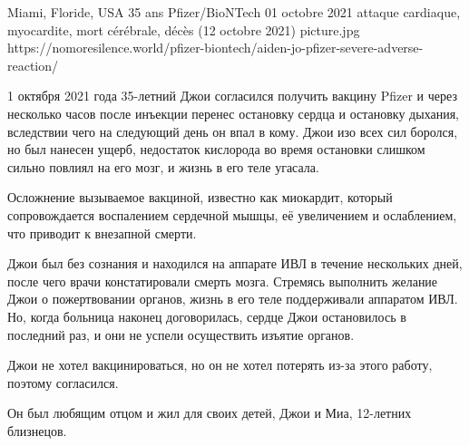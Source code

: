           {Miami, Floride, USA}
          {35 ans}
          {Pfizer/BioNTech}
          {01 octobre 2021}
          {attaque cardiaque, myocardite, mort cérébrale, décès (12 octobre 2021)}
          {picture.jpg}
          {https://nomoresilence.world/pfizer-biontech/aiden-jo-pfizer-severe-adverse-reaction/}
          {

1 октября 2021 года 35-летний Джои согласился получить вакцину Pfizer и через несколько часов после инъекции перенес остановку сердца и остановку дыхания, вследствии чего на следующий день он впал в кому. Джои изо всех сил боролся, но был нанесен ущерб, недостаток кислорода во время остановки слишком сильно повлиял на его мозг, и жизнь в его теле угасала.

Осложнение вызываемое вакциной, известно как миокардит, который сопровождается воспалением сердечной мышцы, её увеличением и ослаблением, что приводит к внезапной смерти.

Джои был без сознания и находился на аппарате ИВЛ в течение нескольких дней, после чего врачи констатировали смерть мозга. Стремясь выполнить желание Джои о пожертвовании органов, жизнь в его теле поддерживали аппаратом ИВЛ. Но, когда больница наконец договорилась, сердце Джои остановилось в последний раз, и они не успели осуществить изъятие органов.

Джои не хотел вакцинироваться, но он не хотел потерять из-за этого работу, поэтому согласился.

Он был любящим отцом и жил для своих детей, Джои и Миа, 12-летних близнецов.

}
